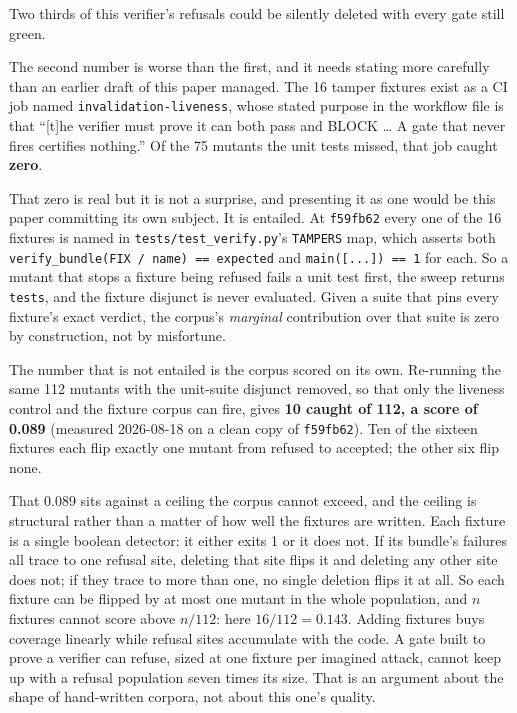 \documentclass[11pt]{article}
\begin{document}
Two thirds of this verifier's refusals could be silently deleted with every gate still green.

The second number is worse than the first, and it needs stating more carefully than an
earlier draft of this paper managed. The 16 tamper fixtures exist as a CI job named
\texttt{invalidation-liveness}, whose stated purpose in the workflow file is that ``[t]he
verifier must prove it can both pass and BLOCK \dots{} A gate that never fires certifies
nothing.'' Of the 75 mutants the unit tests missed, that job caught \textbf{zero}.

That zero is real but it is not a surprise, and presenting it as one would be this paper
committing its own subject. It is entailed. At \texttt{f59fb62} every one of the 16 fixtures
is named in \texttt{tests/test\_verify.py}'s \texttt{TAMPERS} map, which asserts both
\texttt{verify\_bundle(FIX / name) == expected} and \texttt{main([...]) == 1} for each. So a
mutant that stops a fixture being refused fails a unit test first, the sweep returns
\texttt{tests}, and the fixture disjunct is never evaluated. Given a suite that pins every
fixture's exact verdict, the corpus's \emph{marginal} contribution over that suite is zero
by construction, not by misfortune.

The number that is not entailed is the corpus scored on its own. Re-running the same 112
mutants with the unit-suite disjunct removed, so that only the liveness control and the
fixture corpus can fire, gives \textbf{10 caught of 112, a score of 0.089} (measured
2026-08-18 on a clean copy of \texttt{f59fb62}). Ten of the sixteen fixtures each flip
exactly one mutant from refused to accepted; the other six flip none.

That 0.089 sits against a ceiling the corpus cannot exceed, and the ceiling is structural
rather than a matter of how well the fixtures are written. Each fixture is a single boolean
detector: it either exits 1 or it does not. If its bundle's failures all trace to one
refusal site, deleting that site flips it and deleting any other site does not; if they
trace to more than one, no single deletion flips it at all. So each fixture can be flipped by
at most one mutant in the whole population, and $n$ fixtures cannot score above $n/112$:
here $16/112 = 0.143$. Adding fixtures buys coverage linearly while refusal sites accumulate
with the code. A gate built to prove a verifier can refuse, sized at one fixture per imagined
attack, cannot keep up with a refusal population seven times its size. That is an argument
about the shape of hand-written corpora, not about this one's quality.
\end{document}
